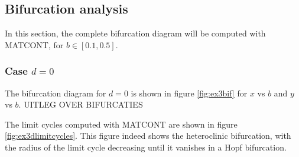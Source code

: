 \subsection{Bifurcation analysis}
In this section, the complete bifurcation diagram will be computed with MATCONT, for $b \in[0.1,0.5]$.
\subsubsection{Case $d=0$}
The bifurcation diagram for $d=0$ is shown in figure \ref{fig:ex3bif} for $x$ vs $b$ and $y$ vs $b$. UITLEG OVER BIFURCATIES

The limit cycles computed with MATCONT are shown in figure \ref{fig:ex3dlimitcycles}. This figure indeed shows the heteroclinic bifurcation, with the radius of the limit cycle decreasing until it vanishes in a Hopf bifurcation. 
